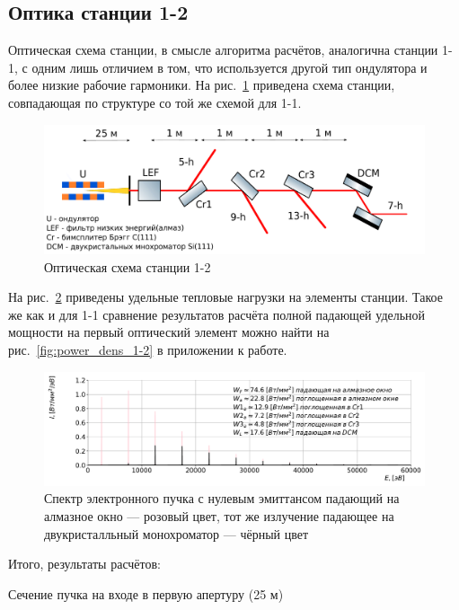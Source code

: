 \subsection{Оптика станции 1-2}
Оптическая схема станции, в смысле алгоритма расчётов, аналогична станции 1-1, с одним лишь отличием в том, что используется другой тип ондулятора и более низкие рабочие гармоники. На рис.~\ref{fig:OptScheme_1-2} приведена схема станции, совпадающая по структуре со той же схемой для 1-1. 
\begin{figure}[h!]
	\centering  
	\includegraphics[width=\textwidth]{pic/OptScheme_1-2.pdf}
	\caption{Оптическая схема станции 1-2}
	\label{fig:OptScheme_1-2}  
\end{figure}
На рис.~\ref{fig:full_spec_1-2} приведены удельные тепловые нагрузки на элементы станции. Такое же как и для 1-1 сравнение результатов расчёта полной падающей удельной мощности на первый оптический элемент можно найти на рис.~\ref{fig:power_dens_1-2} в приложении к работе.
\begin{figure}[h!]
	\centering
	\includegraphics[width=\textwidth]{pic/full_spec_1-2.pdf}
	\caption{Спектр электронного пучка с нулевым эмиттансом падающий на алмазное окно --- розовый цвет, тот же излучение падающее на двукристалльный монохроматор --- чёрный цвет}
	\label{fig:full_spec_1-2}   
\end{figure}

Итого, результаты расчётов: 
\begin{table}[h!]
	\renewcommand*\dtlrealalign{S}
	\centering
	\vspace{4pt} 
	\caption{Сечение пучка на входе в первую апертуру (25 м)}
	\label{table:size_obeam}
\end{table}

